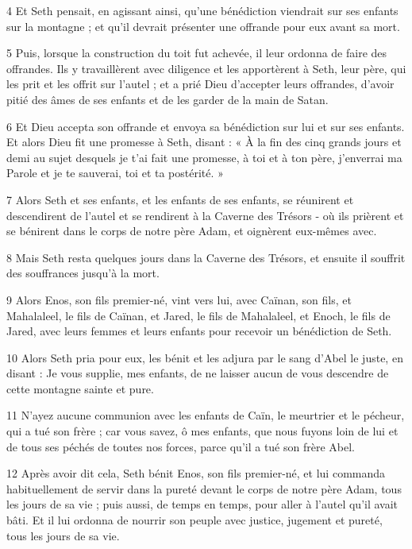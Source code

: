 \par 4 Et Seth pensait, en agissant ainsi, qu'une bénédiction viendrait sur ses enfants sur la montagne ; et qu'il devrait présenter une offrande pour eux avant sa mort.

\par 5 Puis, lorsque la construction du toit fut achevée, il leur ordonna de faire des offrandes. Ils y travaillèrent avec diligence et les apportèrent à Seth, leur père, qui les prit et les offrit sur l'autel ; et a prié Dieu d'accepter leurs offrandes, d'avoir pitié des âmes de ses enfants et de les garder de la main de Satan.

\par 6 Et Dieu accepta son offrande et envoya sa bénédiction sur lui et sur ses enfants. Et alors Dieu fit une promesse à Seth, disant : « À la fin des cinq grands jours et demi au sujet desquels je t'ai fait une promesse, à toi et à ton père, j'enverrai ma Parole et je te sauverai, toi et ta postérité. »

\par 7 Alors Seth et ses enfants, et les enfants de ses enfants, se réunirent et descendirent de l'autel et se rendirent à la Caverne des Trésors - où ils prièrent et se bénirent dans le corps de notre père Adam, et oignèrent eux-mêmes avec.

\par 8 Mais Seth resta quelques jours dans la Caverne des Trésors, et ensuite il souffrit des souffrances jusqu'à la mort.

\par 9 Alors Enos, son fils premier-né, vint vers lui, avec Caïnan, son fils, et Mahalaleel, le fils de Caïnan, et Jared, le fils de Mahalaleel, et Enoch, le fils de Jared, avec leurs femmes et leurs enfants pour recevoir un bénédiction de Seth.

\par 10 Alors Seth pria pour eux, les bénit et les adjura par le sang d'Abel le juste, en disant : Je vous supplie, mes enfants, de ne laisser aucun de vous descendre de cette montagne sainte et pure.

\par 11 N'ayez aucune communion avec les enfants de Caïn, le meurtrier et le pécheur, qui a tué son frère ; car vous savez, ô mes enfants, que nous fuyons loin de lui et de tous ses péchés de toutes nos forces, parce qu'il a tué son frère Abel.

\par 12 Après avoir dit cela, Seth bénit Enos, son fils premier-né, et lui commanda habituellement de servir dans la pureté devant le corps de notre père Adam, tous les jours de sa vie ; puis aussi, de temps en temps, pour aller à l'autel qu'il avait bâti. Et il lui ordonna de nourrir son peuple avec justice, jugement et pureté, tous les jours de sa vie.

